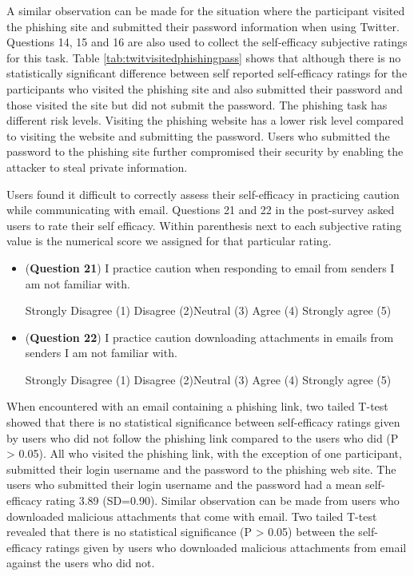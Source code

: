 A similar observation can be made for the situation where the participant visited the phishing site and submitted their password information when using Twitter. 
Questions 14, 15 and 16 are also used to collect the self-efficacy subjective ratings for this task.
Table \ref{tab:twitvisitedphishingpass} shows that although there is no statistically significant difference between self reported self-efficacy ratings for the participants who visited the phishing site and also submitted their password and those visited the site but did not submit the password.
The phishing task has different risk levels.
Visiting the phishing website has a lower risk level compared to visiting the website and submitting the password.
Users who submitted the password to the phishing site further compromised their security by enabling the attacker to steal private information.

Users found it difficult to correctly assess their self-efficacy in practicing caution while communicating with email. 
Questions 21 and 22 in the post-survey asked users to rate their self efficacy. 
Within parenthesis next to each subjective rating value is the numerical score we assigned for that particular rating.
\begin{itemize}
\item (\textbf{Question 21}) I practice caution when responding to email from senders I am not familiar with.
\par Strongly Disagree (1) \hspace{0.5cm} Disagree (2)\hspace{0.5cm}Neutral (3)\hspace{0.5cm} Agree (4)\hspace{0.5cm} Strongly agree (5)
\item (\textbf{Question 22}) I practice caution downloading attachments in emails from senders I am not familiar with.
\par Strongly Disagree (1) \hspace{0.5cm} Disagree (2)\hspace{0.5cm}Neutral (3)\hspace{0.5cm} Agree (4)\hspace{0.5cm} Strongly agree (5)
\end{itemize}
When encountered with an email containing a phishing link, two tailed T-test showed that there is no statistical significance between self-efficacy ratings given by users who did not follow the phishing link compared to the users who did (P > 0.05). 
All who visited the phishing link, with the exception of one participant,  submitted their login username and the password to the phishing web site. 
The users who submitted their login username and the password had a mean self-efficacy rating 3.89 (SD=0.90). 
Similar observation can be made from users who downloaded malicious attachments that come with email. Two tailed T-test revealed that there is no statistical significance (P > 0.05) between the self-efficacy ratings given by users who downloaded malicious attachments  from email against the users who did not.

